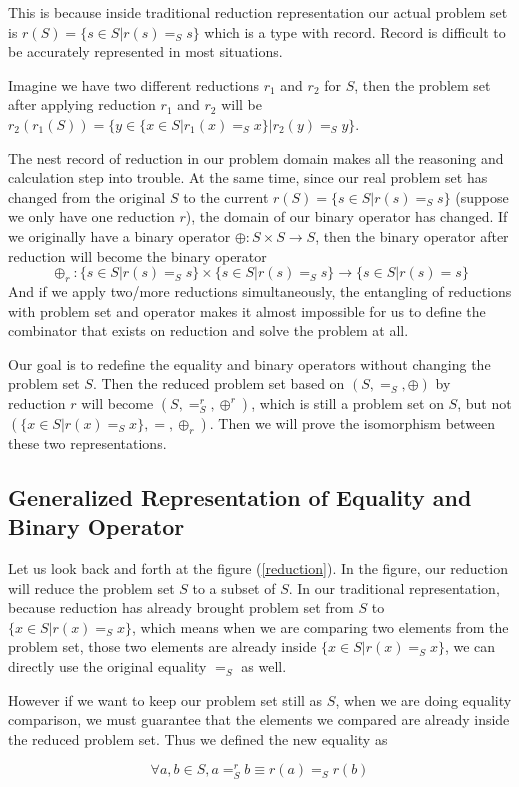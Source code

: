 \documentclass[a4paper,10pt]{article}
\newcommand{\e}[2]{
\begin{equation}
  \label{#1} 
  #2
\end{equation}
}
\begin{document}
This is because inside traditional reduction representation our actual problem set is $r(S) = \{s\in S|r(s)=_S s\}$ which is a type with record. Record is difficult to be accurately represented in most situations. 

Imagine we have two different reductions $r_1$ and $r_2$ for $S$, then the problem set after applying reduction $r_1$ and $r_2$ will be $r_2(r_1(S)) = \{y\in \{x \in S | r_1(x) =_S x\}|r_2(y)=_S y\}$. 

The nest record of reduction in our problem domain makes all the reasoning and calculation step into trouble. 
At the same time, since our real problem set has changed from the original $S$ to the current $r(S) = \{s\in S|r(s)=_S s\}$ (suppose we only have one reduction $r$), the domain of our binary operator has changed. If we originally have a binary operator $\oplus : S\times S \rightarrow S$, then the binary operator after reduction will become the binary operator \[\oplus_r : \{s\in S|r(s)=_S s\} \times \{s\in S|r(s)=_S s\} \rightarrow \{s\in S|r(s)= s\}\] And if we apply two/more reductions simultaneously, the entangling of reductions with problem set and operator makes it almost impossible for us to define the combinator that exists on reduction and solve the problem at all.

Our goal is to redefine the equality and binary operators without changing the problem set $S$. 
Then the reduced problem set based on $(S,=_S,\oplus)$ by reduction $r$ will become $(S,=^r_S,\oplus^r)$, which is still a problem set on $S$, but not $(\{x \in S | r(x) =_S x\}, =,\oplus_r)$. 
Then we will prove the isomorphism between these two representations.

\subsection{Generalized Representation of Equality and Binary Operator}
Let us look back and forth at the figure (\ref{reduction}). In the figure, our reduction will reduce the problem set $S$ to a subset of $S$. In our traditional representation, because reduction has already brought problem set from $S$ to $\{x \in S | r(x) =_S x\}$, which means when we are comparing two elements from the problem set, those two elements are already inside $\{x \in S | r(x) =_S x\}$, we can directly use the original equality $=_S$ as well.

However if we want to keep our problem set still as $S$, when we are doing equality comparison, we must guarantee that the elements we compared are already inside the reduced problem set. Thus we defined the new equality as
\e{gr:def:eq}{\forall a,b \in S, a =^r_S b \equiv r(a) =_S r(b)}
\end{document}
